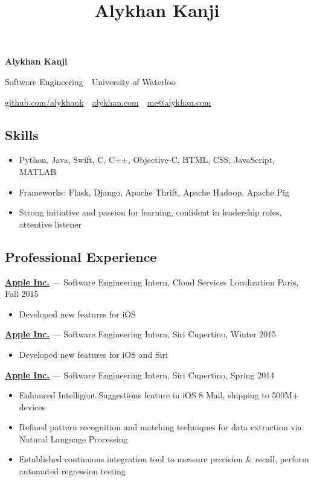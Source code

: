 \documentclass[pdftex,11pt,letterpaper]{article}
\title{Alykhan Kanji}
\begin{document}
\font

\begin{center}
  {\Huge \textbf{Alykhan Kanji}}

  {\large
    Software Engineering\ \textperiodcentered \ University of Waterloo

    \href{https://github.com/alykhank}{github.com/alykhank}\ \textperiodcentered \ \href{http://alykhan.com}{alykhan.com}\ \textperiodcentered \ \href{mailto:me@alykhan.com}{me@alykhan.com}
  }
\end{center}

\subsection*{Skills}

\begin{itemize}[before=,after=]
  \item Python, Java, Swift, C, C++, Objective-C, HTML, CSS, JavaScript, MATLAB
  \item Frameworks: Flask, Django, Apache Thrift, Apache Hadoop, Apache Pig
  \item Strong initiative and passion for learning, confident in leadership roles, attentive listener
\end{itemize}

\subsection*{Professional Experience}

\href{https://apple.com}{\textbf{Apple Inc.}} --- Software Engineering Intern, Cloud Services Localization \hfill {\color{gray} Paris, Fall 2015}
\begin{itemize}
  \item Developed new features for iOS
\end{itemize}

\href{https://apple.com}{\textbf{Apple Inc.}} --- Software Engineering Intern, Siri \hfill {\color{gray} Cupertino, Winter 2015}
\begin{itemize}
  \item Developed new features for iOS and Siri
\end{itemize}

\href{https://apple.com}{\textbf{Apple Inc.}} --- Software Engineering Intern, Siri \hfill {\color{gray} Cupertino, Spring 2014}
\begin{itemize}
  \item Enhanced Intelligent Suggestions feature in iOS 8 Mail, shipping to 500M+ devices
  \item Refined pattern recognition and matching techniques for data extraction via Natural Language Processing
  \item Established continuous integration tool to measure precision \& recall, perform automated regression testing
\end{itemize}
\end{document}
